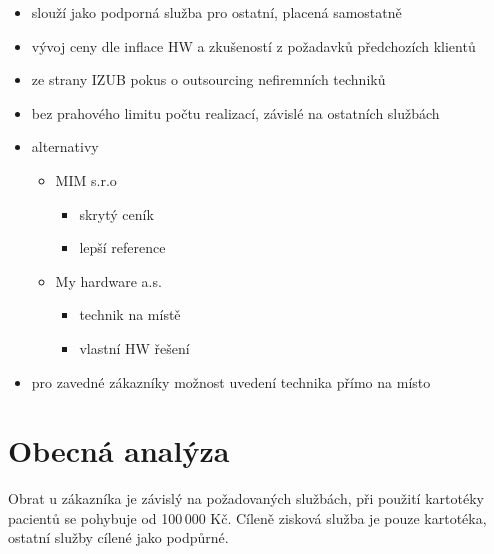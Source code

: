 \documentclass[11pt, a4paper, titlepage]{article}
\begin{document}
	\begin{itemize}
		\item slouží jako podporná služba pro ostatní, placená samostatně
		\item vývoj ceny dle inflace HW a zkušeností z požadavků předchozích klientů
		\item ze strany IZUB pokus o outsourcing nefiremních techniků
		\item bez prahového limitu počtu realizací, závislé na ostatních službách
		\item alternativy
		\begin{itemize}
			\item MIM s.r.o
			\begin{itemize}
				\item skrytý ceník
				\item lepší reference
			\end{itemize}
			\item My hardware a.s.
			\begin{itemize}
				\item technik na místě
				\item vlastní HW řešení
			\end{itemize}
		\end{itemize}
		\item pro zavedné zákazníky možnost uvedení technika přímo na místo
	\end{itemize}

	\section*{Obecná analýza}
	Obrat u zákazníka je závislý na požadovaných službách, při použití kartotéky pacientů se pohybuje od 100\,000 Kč. 
	Cíleně zisková služba je pouze kartotéka, ostatní služby cílené jako podpůrné.
\end{document}
